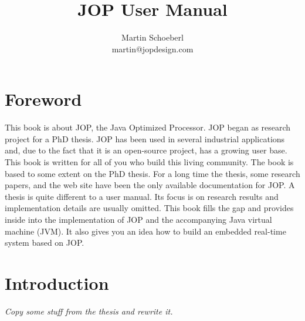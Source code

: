 







\title{JOP User Manual}
\author{Martin Schoeberl\\martin@jopdesign.com}
\maketitle \thispagestyle{empty}

%


%

\pagestyle{scrheadings} 

\tableofcontents \cleardoublepage
 \listoftables \newpage \listoffigures
 \newpage \lstlistoflistings \newpage

\chapter*{Foreword}

This book is about JOP, the Java Optimized Processor. JOP began as
research project for a PhD thesis. JOP has been used in several
industrial applications and, due to the fact that it is an
open-source project, has a growing user base. This book is written
for all of you who build this living community. The book is based to
some extent on the PhD thesis. For a long time the thesis, some
research papers, and the web site  have been the only available
documentation for JOP. A thesis is quite different to a user manual.
Its focus is on research results and implementation details are
usually omitted. This book fills the gap and provides inside into
the implementation of JOP and the accompanying Java virtual machine
(JVM). It also gives you an idea how to build an embedded real-time
system based on JOP.


\pagestyle{scrheadings} 



\chapter{Introduction}
\label{chap:intro}

\emph{Copy some stuff from the thesis and rewrite it.}
    

